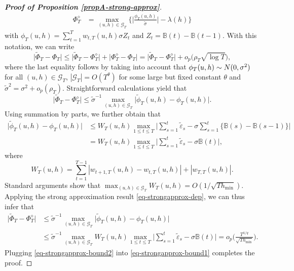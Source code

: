 \begin{proof}[\textnormal{\textbf{Proof of Proposition \ref{propA-strong-approx}}}]
\begin{align*}
\Phi_T^{\diamond} & = \max_{(u,h) \in \mathcal{G}_T} \Big\{ \Big|\frac{\phi_T(u,h)}{\widetilde{\sigma}}\Big| - \lambda(h) \Big\} 
\end{align*}
with $\phi_T(u,h) = \sum\nolimits_{t=1}^T w_{t,T}(u,h) \sigma Z_t$ and $Z_t = \mathbb{B}(t) - \mathbb{B}(t-1)$. With this notation, we can write 
\begin{equation}\label{eq-strongapprox-bound1}
\big| \widetilde{\Phi}_T - \Phi_T \big| \le \big| \widetilde{\Phi}_T - \Phi_T^{\diamond} \big| + \big| \Phi_T^{\diamond} - \Phi_T \big| = \big| \widetilde{\Phi}_T - \Phi_T^{\diamond} \big| + o_p \big( \rho_T \sqrt{\log T} \big), 
\end{equation}
where the last equality follows by taking into account that $\phi_T(u,h) \sim N(0,\sigma^2)$ for all $(u,h) \in \mathcal{G}_T$, $|\mathcal{G}_T| = O(T^\theta)$ for some large but fixed constant $\theta$ and $\widetilde{\sigma}^2 = \sigma^2 + o_p(\rho_T)$. Straightforward calculations yield that 
\[ \big| \widetilde{\Phi}_T - \Phi_T^{\diamond} \big| \le \widetilde{\sigma}^{-1} \max_{(u,h) \in \mathcal{G}_T} \big| \widetilde{\phi}_T(u,h) - \phi_T(u,h) \big|. \]
Using summation by parts,
we further obtain that 
\begin{align*}
\big| \widetilde{\phi}_T(u,h) - \phi_T(u,h) \big| 
 & \le W_T(u,h) \max_{1 \le t \le T} \Big| \sum\limits_{s=1}^t \widetilde{\varepsilon}_s - \sigma \sum\limits_{s=1}^t \big\{ \mathbb{B}(s) - \mathbb{B}(s-1) \big\} \Big| \\
 & = W_T(u,h) \max_{1 \le t \le T} \Big| \sum\limits_{s=1}^t \widetilde{\varepsilon}_s - \sigma \mathbb{B}(t) \Big|,
\end{align*}
where
\[ W_T(u,h) = \sum\limits_{t=1}^{T-1} |w_{t+1,T}(u,h) - w_{t,T}(u,h)| + |w_{T,T}(u,h)|. \]
Standard arguments show that $\max_{(u,h) \in \mathcal{G}_T} W_T(u,h) = O( 1/\sqrt{Th_{\min}} )$. Applying the strong approximation result \eqref{eq-strongapprox-dep}, we can thus infer that 
\begin{align}
\big| \widetilde{\Phi}_T - \Phi_T^{\diamond} \big| 
 & \le \widetilde{\sigma}^{-1} \max_{(u,h) \in \mathcal{G}_T} \big| \widetilde{\phi}_T(u,h) - \phi_T(u,h) \big| \nonumber \\
 & \le \widetilde{\sigma}^{-1} \max_{(u,h) \in \mathcal{G}_T} W_T(u,h) \max_{1 \le t \le T} \Big| \sum\limits_{s=1}^t \widetilde{\varepsilon}_s - \sigma \mathbb{B}(t) \Big| 
   = o_p \Big( \frac{T^{1/q}}{\sqrt{Th_{\min}}} \Big). \label{eq-strongapprox-bound2}
\end{align}
Plugging \eqref{eq-strongapprox-bound2} into \eqref{eq-strongapprox-bound1} completes the proof.
\end{proof}



